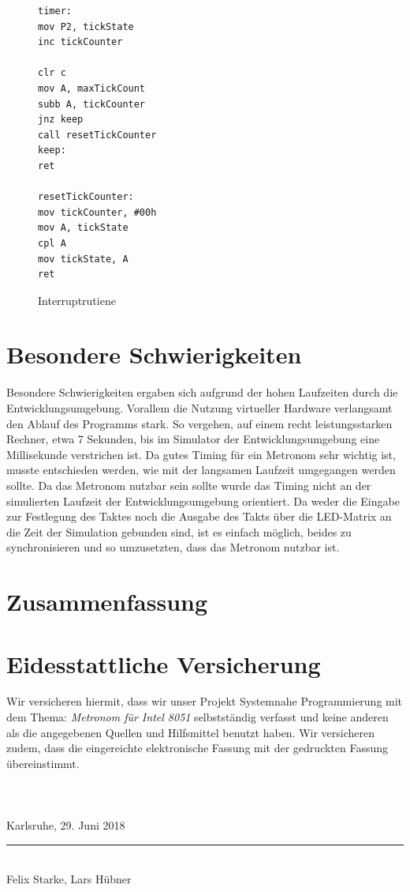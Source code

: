 \documentclass[a4paper, 12pt]{scrartcl}
\def \autoren {Felix Starke, Lars Hübner}
\def \titel {Metronom für Intel 8051}
\def \arbeit {Projekt Systemnahe Programmierung}
\begin{document}
\begin{onehalfspace}
\begin{figure}
\begin{lstlisting}
timer:
mov P2, tickState	
inc tickCounter		

clr c
mov A, maxTickCount
subb A, tickCounter	
jnz keep
call resetTickCounter	
keep:
ret

resetTickCounter:
mov tickCounter, #00h	
mov A, tickState	
cpl A
mov tickState, A
ret
\end{lstlisting}
\caption{Interruptrutiene}
\label{lst:timer}
\end{figure}

\newpage
\section{Besondere Schwierigkeiten}
Besondere Schwierigkeiten ergaben sich aufgrund der hohen Laufzeiten durch die Entwicklungsumgebung. Vorallem die Nutzung virtueller Hardware verlangsamt den Ablauf des Programms stark. So vergehen, auf einem recht leistungsstarken Rechner, etwa 7 Sekunden, bis im Simulator der Entwicklungsumgebung eine Millisekunde verstrichen ist. Da gutes Timing für ein Metronom sehr wichtig ist, musste entschieden werden, wie mit der langsamen Laufzeit umgegangen werden sollte. Da das Metronom nutzbar sein sollte wurde das Timing nicht an der simulierten Laufzeit der Entwicklungsumgebung orientiert. Da weder die Eingabe zur Festlegung des Taktes noch die Ausgabe des Takts über die LED-Matrix an die Zeit der Simulation gebunden sind, ist es einfach möglich, beides zu synchronisieren und so umzusetzten, dass das Metronom nutzbar ist.
\\

\section{Zusammenfassung}

\newpage
\section{Eidesstattliche Versicherung}

Wir versicheren hiermit, dass wir unser {\arbeit} mit dem Thema: {\itshape \titel } selbstständig verfasst und keine anderen als die angegebenen Quellen und Hilfsmittel benutzt haben. Wir versicheren zudem, dass die eingereichte elektronische Fassung mit der gedruckten Fassung übereinstimmt. 
\\
\\
\\
\\
\vspace{3em}
Karlsruhe, 29. Juni 2018
\vspace{4em}
\\
\rule{10cm}{0.4pt}\\
\autoren

\end{onehalfspace}
\end{document}
